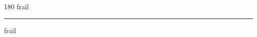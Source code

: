 
\begin{frame}
\begin{center}
\begin{turn}{180}
{\fontsize{2.5cm}{1em}\selectfont frail}
\end{turn}
\vspace{1em}\par  
\hrule
\vspace{1em}\par  
{\fontsize{2.5cm}{1em}\selectfont frail}
\end{center}
\end{frame}
